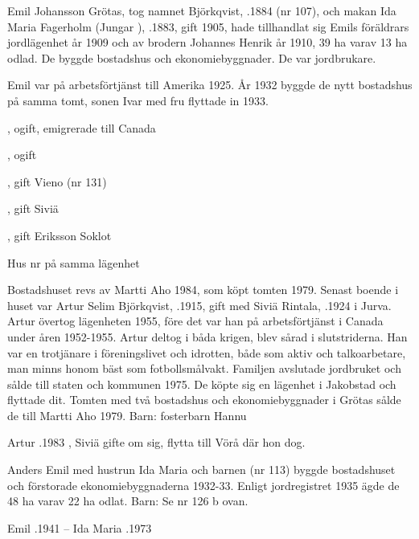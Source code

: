 Emil Johansson Grötas, tog namnet Björkqvist, .1884 (nr 107), och makan Ida Maria Fagerholm (Jungar    ), .1883, gift 1905, hade tillhandlat sig Emils föräldrars jordlägenhet år 1909 och av brodern Johannes Henrik år 1910, 39 ha varav 13 ha odlad. De byggde bostadshus och ekonomiebyggnader. De var jordbrukare.

Emil var på arbetsförtjänst till Amerika 1925. År 1932 byggde de nytt bostadshus på samma tomt, sonen Ivar med fru  flyttade in 1933.
\begin{jhchildren}
  \item {}, ogift, emigrerade till Canada
  \item {}, ogift
  \item {}, gift Vieno (nr 131)
  \item {}, gift Siviä
  \item {}, gift Eriksson Soklot
\end{jhchildren}


Hus nr  på samma lägenhet

Bostadshuset revs av Martti Aho 1984, som köpt tomten 1979. Senast boende i huset var Artur Selim Björkqvist, .1915, gift med Siviä Rintala, .1924 i Jurva. Artur övertog lägenheten 1955, före det var han på arbetsförtjänst i Canada under åren 1952-1955. Artur deltog i båda krigen, blev sårad i slutstriderna.  Han var  en trotjänare i föreningslivet och idrotten, både som aktiv och talkoarbetare, man minns honom bäst som fotbollsmålvakt.  Familjen avslutade jordbruket och sålde till staten och kommunen 1975. De köpte sig en lägenhet i Jakobstad och flyttade dit. Tomten med två bostadshus och ekonomiebyggnader i Grötas sålde de till Martti Aho 1979.
Barn: fosterbarn Hannu

Artur .1983 , Siviä gifte om sig, flytta till Vörå där hon dog.


Anders Emil med hustrun Ida Maria och barnen (nr 113) byggde bostadshuset och förstorade ekonomiebyggnaderna 1932-33. Enligt jordregistret 1935 ägde de 48 ha varav 22 ha odlat.
Barn: Se nr 126 b ovan.

Emil .1941  --  Ida Maria .1973




